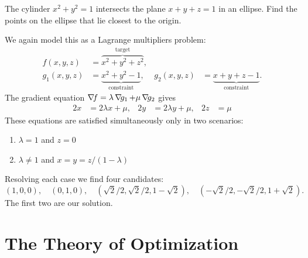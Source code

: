 \begin{example}
The cylinder $x^2+y^2=1$ intersects the plane $x+y+z=1$ in an ellipse.  Find the points on the ellipse that lie closest to the origin.

We again model this as a Lagrange multipliers problem:
\begin{align*}
f(x,y,z) &= \overbrace{x^2+y^2+z^2}^{\text{target}}, \\ 
g_1(x,y,z)&= \underbrace{x^2+y^2-1}_{\text{constraint}}, & g_2(x,y,z) &= \underbrace{x+y+z-1}_{\text{constraint}}.
\end{align*}
The gradient equation $\mathop{\nabla\! {f}} = \lambda \mathop{\nabla\! {g_1}} + \mu \mathop{\nabla\! {g_2}}$ gives
\begin{align*}
2x &= 2\lambda x + \mu, &2y &= 2\lambda y+\mu, &2z &= \mu
\end{align*}
These equations are satisfied simultaneously only in two scenarios:
\begin{enumerate}
	\item $\lambda=1$ and $z=0$
	\item $\lambda \neq 1$ and $x=y=z/(1-\lambda)$
\end{enumerate} 
Resolving each case we find four candidates: 
\begin{equation*}
(1,0,0), \quad(0,1,0), \quad (\sqrt{2}/2, \sqrt{2}/2, 1- \sqrt{2}), \quad(-\sqrt{2}/2, -\sqrt{2}/2, 1+\sqrt{2}).
\end{equation*}  
The first two are our solution.
\end{example}

\section*{The Theory of Optimization}

